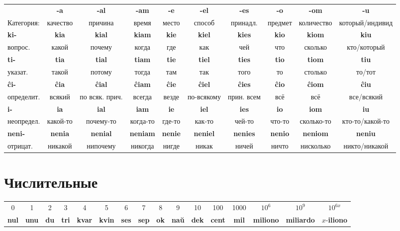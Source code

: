 \documentclass{article}
\def\b#1{\textbf{#1}}
\begin{document}
\begin{tabular}{lccccccccc}
 & \b{-a} & \b{-al} & \b{-am} & \b{-e} & \b{-el} & \b{-es} & \b{-o} & \b{-om} & \b{-u} \\
Категория: & качество & причина & время & место & способ & принадл. & предмет & количество & который/индивид \\
\b{ki-} & \b{kia} & \b{kial} & \b{kiam} & \b{kie} & \b{kiel} & \b{kies} & \b{kio} & \b{kiom} & \b{kiu} \\
вопрос. & какой & почему & когда & где & как & чей & что & сколько & кто/который \\
\b{ti-} & \b{tia} & \b{tial} & \b{tiam} & \b{tie} & \b{tiel} & \b{ties} & \b{tio} & \b{tiom} & \b{tiu} \\
указат. & такой & потому & тогда & там & так & того & то & столько & то/тот \\
\b{ĉi-} & \b{ĉia} & \b{ĉial} & \b{ĉiam} & \b{ĉie} & \b{ĉiel} & \b{ĉies} & \b{ĉio} & \b{ĉiom} & \b{ĉiu} \\
определит. & всякий & по всяк. прич. & всегда & везде & по-всякому & прин. всем & всё & всё & все/всякий \\
\b{i-} & \b{ia} & \b{ial} & \b{iam} & \b{ie} & \b{iel} & \b{ies} & \b{io} & \b{iom} & \b{iu} \\
неопредел. & какой-то & почему-то & когда-то & где-то & как-то & чей-то & что-то & сколько-то & кто-то/какой-то \\
\b{neni-} & \b{nenia} & \b{nenial} & \b{neniam} & \b{nenie} & \b{neniel} & \b{nenies} & \b{nenio} & \b{neniom} & \b{neniu} \\
отрицат. & никакой & нипочему & никогда & нигде & никак & ничей & ничто & нисколько & никто/никакой \\
\end{tabular}

\section{Числительные}

\begin{tabular}{cccccccccccccccc}
0 & 1 & 2 & 3 & 4 & 5 & 6 & 7 & 8 & 9 & 10 & 100 & 1000 & $10^6$ & $10^9$ & $10^{6x}$ \\
\b{nul} & \b{unu} & \b{du} & \b{tri} & \b{kvar} & \b{kvin} & \b{ses} & \b{sep} & \b{ok} & \b{naŭ} & \b{dek} & \b{cent} & \b{mil} & \b{miliono} & \b{miliardo} & $x$-\b{iliono} \\
\end{tabular}
\end{document}
